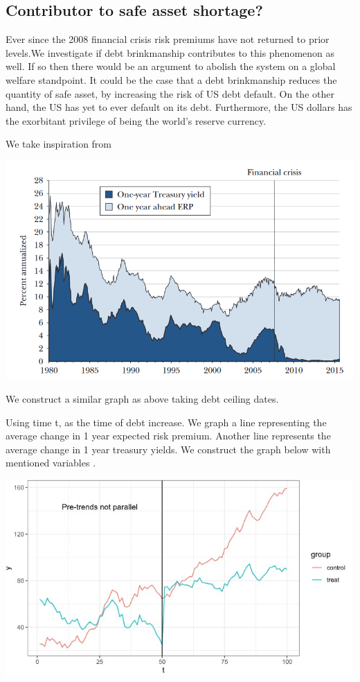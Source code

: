 \documentclass[
  12pt]{article}
\begin{document}
\hypertarget{contributor-to-safe-asset-shortage}{%
\subsection{Contributor to safe asset
shortage?}\label{contributor-to-safe-asset-shortage}}

Ever since the 2008 financial crisis risk premiums have not returned to
prior levels\citep{caballero2017}.We investigate if debt brinkmanship
contributes to this phenomenon as well. If so then there would be an
argument to abolish the system on a global welfare standpoint. It could
be the case that a debt brinkmanship reduces the quantity of safe asset,
by increasing the risk of US debt default. On the other hand, the US has
yet to ever default on its debt. Furthermore, the US dollars has the
exorbitant privilege of being the world's reserve currency.

We take inspiration from

\includegraphics[width=6.10417in,height=\textheight]{style-guide/1_year_ERP.png}

We construct a similar graph as above taking debt ceiling dates.

Using time t, as the time of debt increase. We graph a line representing
the average change in 1 year expected risk premium. Another line
represents the average change in 1 year treasury yields. We construct
the graph below with mentioned variables \citep{duarte2015}.

\includegraphics[width=5.21875in,height=\textheight]{style-guide/1_year_ERP_parallel_trends.jpeg}
\end{document}
